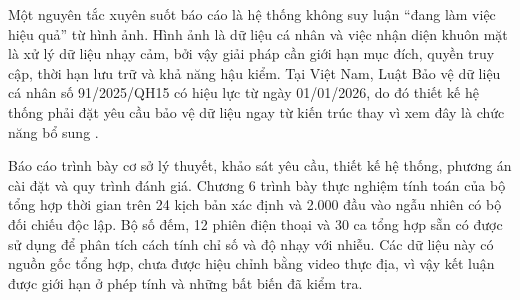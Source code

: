 Một nguyên tắc xuyên suốt báo cáo là hệ thống không suy luận ``đang làm việc hiệu quả'' từ hình ảnh. Hình ảnh là dữ liệu cá nhân và việc nhận diện khuôn mặt là xử lý dữ liệu nhạy cảm, bởi vậy giải pháp cần giới hạn mục đích, quyền truy cập, thời hạn lưu trữ và khả năng hậu kiểm. Tại Việt Nam, Luật Bảo vệ dữ liệu cá nhân số 91/2025/QH15 có hiệu lực từ ngày 01/01/2026, do đó thiết kế hệ thống phải đặt yêu cầu bảo vệ dữ liệu ngay từ kiến trúc thay vì xem đây là chức năng bổ sung \cite{vnprivacy}.

Báo cáo trình bày cơ sở lý thuyết, khảo sát yêu cầu, thiết kế hệ thống, phương án cài đặt và quy trình đánh giá. Chương 6 trình bày thực nghiệm tính toán của bộ tổng hợp thời gian trên 24 kịch bản xác định và 2.000 đầu vào ngẫu nhiên có bộ đối chiếu độc lập. Bộ số đếm, 12 phiên điện thoại và 30 ca tổng hợp sẵn có được sử dụng để phân tích cách tính chỉ số và độ nhạy với nhiễu. Các dữ liệu này có nguồn gốc tổng hợp, chưa được hiệu chỉnh bằng video thực địa, vì vậy kết luận được giới hạn ở phép tính và những bất biến đã kiểm tra.